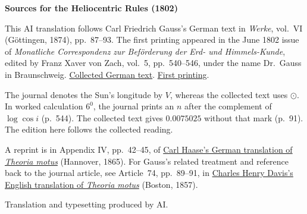 \clearpage\thispagestyle{empty}
\begin{center}\textbf{Sources for the Heliocentric Rules (1802)}\end{center}
\noindent This AI translation follows Carl Friedrich Gauss’s German text in \textit{Werke}, vol.~VI (Göttingen, 1874), pp.~87--93. The first printing appeared in the June 1802 issue of \textit{Monatliche Correspondenz zur Beförderung der Erd- und Himmels-Kunde}, edited by Franz Xaver von Zach, vol.~5, pp.~540--546, under the name Dr.~Gauss in Braunschweig. \href{https://gdz.sub.uni-goettingen.de/id/PPN236007467}{Collected German text}. \href{https://www.digitale-sammlungen.de/en/view/bsb10538597?page=556}{First printing}.
\par\smallskip\noindent The journal denotes the Sun’s longitude by \(V\), whereas the collected text uses \(\odot\). In worked calculation \(6^{0}\), the journal prints an \(n\) after the complement of \(\log\cos i\) (p.~544). The collected text gives \(0.0075025\) without that mark (p.~91). The edition here follows the collected reading.
\par\smallskip\noindent A reprint is in Appendix IV, pp.~42--45, of \href{https://gdz.sub.uni-goettingen.de/id/PPN60187157X}{Carl Haase’s German translation of \textit{Theoria motus}} (Hannover, 1865). For Gauss’s related treatment and reference back to the journal article, see Article~74, pp.~89--91, in \href{https://www2.karlin.mff.cuni.cz/~tuma/Aplikace21/theoryofmotionof00gausuoft.pdf#page=113}{Charles Henry Davis’s English translation of \textit{Theoria motus}} (Boston, 1857).
\par\smallskip\noindent Translation and typesetting produced by AI.
\clearpage
